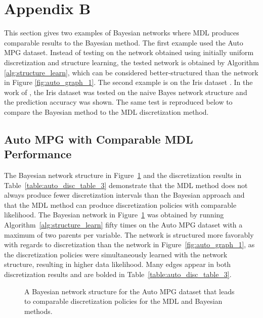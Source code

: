 \section*{Appendix B}
\label{sec:appendixB}

This section gives two examples of Bayesian networks where MDL produces comparable results to the Bayesian method.
The first example used the Auto MPG dataset.
Instead of testing on the network obtained using initially uniform discretization and structure learning, the tested network is obtained by Algorithm \ref{alg:structure_learn}, which can be considered better-structured than the network in Figure \ref{fig:auto_graph_1}.
The second example is on the Iris dataset \citep{Lichman_2013}.
In the work of \cite{Friedman_1996}, the Iris dataset was tested on the naive Bayes network structure and the prediction accuracy was shown.
The same test is reproduced below to compare the Bayesian method to the MDL discretization method.

\subsection*{Auto MPG with Comparable MDL Performance}
The Bayesian network structure in Figure~\ref{fig:auto_graph_3} and the discretization results in Table~\ref{table:auto_disc_table_3} demonstrate that the MDL method does not always produce fewer discretization intervals than the Bayesian approach and that the MDL method can produce discretization policies with comparable likelihood.
The Bayesian network in Figure~\ref{fig:auto_graph_3} was obtained by running Algorithm~\ref{alg:structure_learn} fifty times on the Auto MPG dataset with a maximum of two parents per variable.
The network is structured more favorably with regards to discretization than the network in Figure~\ref{fig:auto_graph_1}, as the discretization policies were simultaneously learned with the network structure, resulting in higher data likelihood.
Many edges appear in both discretization results and are bolded in Table~\ref{table:auto_disc_table_3}.

\begin{figure}[ht]
  \centering
  \scalebox{0.8}{}
  \caption{A Bayesian network structure for the Auto MPG dataset that leads to comparable discretization policies for the MDL and Bayesian methods.}
  \label{fig:auto_graph_3}
\end{figure}

\begin{table}[ht]
  \centering
  \caption{
    The discretization policies for the Auto MPG dataset with the fixed structure shown in Figure~\ref{fig:auto_graph_3}.
    The methods have the same discretization for variable $A$, and the log-likelihood for the Bayesian method is only slightly better than that for the MDL method.
  }

  \label{table:auto_disc_table_3}
\end{table}

